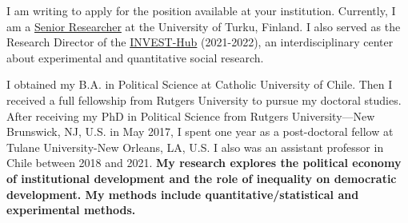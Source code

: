 \vspace{-0.3cm}I am writing to apply for the position available at your institution. Currently, I am a \href{https://www.utu.fi/en/people/hector-bahamonde}{Senior Researcher} at the University of Turku, Finland. I also served as the Research Director of the \href{https://www.utu.fi/en/investhub}{INVEST-Hub} (2021-2022), an interdisciplinary center about experimental and quantitative social research. %

I obtained my B.A. in Political Science at Catholic University of Chile. Then I received a full fellowship from Rutgers University to pursue my doctoral studies. After receiving my PhD in Political Science from Rutgers University---New Brunswick, NJ, U.S. in May 2017, I spent one year as a post-doctoral fellow at Tulane University-New Orleans, LA, U.S. I also was an assistant professor in Chile between 2018 and 2021. {\bf My research explores the political economy of institutional development and the role of inequality on democratic development. My methods include quantitative/statistical and experimental methods.} 